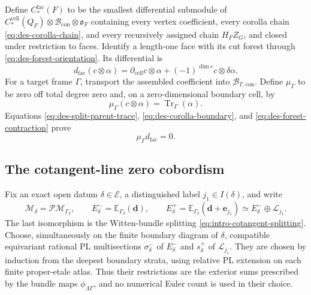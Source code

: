 Define $C_*^{\mathrm{fac}}(F)$ to be the smallest differential submodule of
$C_*^{\mathrm{cell}}(Q_F)\otimes
\mathcal B_{\mathrm{con}}\otimes\mathfrak o_F$ containing every vertex coefficient,
every corolla chain \eqref{eq:des-corolla-chain}, and every recursively
assigned chain $H_FZ_G$, and closed under restriction to faces.  Identify a
length-one face with its cut forest through
\eqref{eq:des-forest-orientation}.  Its differential is
\begin{equation}
 d_{\mathrm{fac}}(c\otimes\alpha)
 =\partial_{\mathrm{cell}}c\otimes\alpha
  +(-1)^{\dim c}c\otimes\delta\alpha.
 \label{eq:des-factorization-differential}
\end{equation}
For a target frame $\Gamma$, transport the assembled coefficient into
$\mathcal B_{\Gamma,\mathrm{con}}$.  Define $\mu_\Gamma$ to be zero off
total degree zero and, on a zero-dimensional boundary cell, by
\begin{equation}
 \mu_\Gamma(c\otimes\alpha)
 =\operatorname{Tr}_\Gamma(\alpha).
 \label{eq:des-factorization-moment}
\end{equation}
Equations \eqref{eq:des-split-parent-trace},
\eqref{eq:des-corolla-boundary}, and
\eqref{eq:des-forest-contraction} prove
\begin{equation}
 \mu_\Gamma d_{\mathrm{fac}}=0.
 \label{eq:des-factorization-cocycle}
\end{equation}

\subsection{The cotangent-line zero cobordism}

Fix an exact open datum $\delta\in\mathcal E$, a distinguished label
$j_1\in I(\delta)$, and write
\begin{equation}
 \mathcal M_\delta=\mathcal{PM}_{\Gamma_\delta},\qquad
 E_\delta^-=\mathbb E_{\Gamma_\delta}(\mathbf d),\qquad
 E_\delta^+=\mathbb E_{\Gamma_\delta}(\mathbf d+\mathbf e_{j_1})
 \simeq E_\delta^-\oplus\mathcal L_{j_1}.
 \label{eq:des-open-bundles}
\end{equation}
The last isomorphism is the Witten-bundle splitting
\eqref{eq:intro-cotangent-splitting}.  Choose, simultaneously on the finite
boundary diagram of $\delta$, compatible equivariant rational PL
multisections $\sigma_\delta^-$ of $E_\delta^-$ and $s_\delta^+$ of
$\mathcal L_{j_1}$.  They are chosen by induction from the deepest boundary
strata, using relative PL extension on each finite proper-etale atlas.  Thus
their restrictions are the exterior sums prescribed by the bundle maps
$\phi_{\Lambda\Gamma}$, and no numerical Euler count is used in their
choice.

